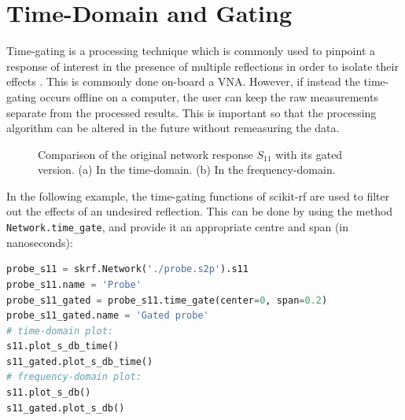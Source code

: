 \documentclass[10pt, letterpaper]{scrartcl}
\newcommand{\skrf}{{s}cikit-rf\xspace}
\begin{document}
\section{Time-Domain and Gating}
Time-gating is a processing technique which is commonly used to pinpoint a response of interest in the presence of multiple reflections in order to isolate their effects \cite{cronson1973, bennett1978}. This is commonly done on-board a VNA. However, if instead the time-gating occurs offline on a computer, the user can keep the raw measurements separate from the processed results. This is important so that the processing algorithm can be altered in the future without remeasuring the data. 

\begin{figure}
	\centering
	\caption{Comparison of the original network response $S_{11}$ with its gated version. (a) In the time-domain. (b) In the frequency-domain.}
	\label{figs:gating}
\end{figure}

In the following example, the time-gating functions of \skrf{} are used to filter out the effects of an undesired reflection. This can be done by using the method \texttt{Network.time\_gate}, and provide it an appropriate centre and span (in nanoseconds):

\begin{lstlisting}[language=Python]
probe_s11 = skrf.Network('./probe.s2p').s11
probe_s11.name = 'Probe'
probe_s11_gated = probe_s11.time_gate(center=0, span=0.2)
probe_s11_gated.name = 'Gated probe'
# time-domain plot:
s11.plot_s_db_time()
s11_gated.plot_s_db_time()
# frequency-domain plot:
s11.plot_s_db()
s11_gated.plot_s_db()
\end{lstlisting}
\end{document}
